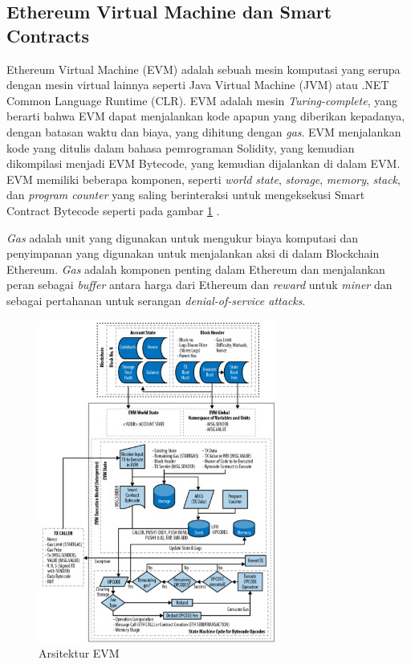\subsection{Ethereum Virtual Machine dan Smart Contracts}
\label{subsec:evm-smart-contract}

Ethereum Virtual Machine (EVM) adalah sebuah mesin komputasi yang serupa dengan mesin virtual lainnya seperti Java Virtual Machine (JVM) atau .NET Common Language Runtime (CLR). EVM adalah mesin \textit{Turing-complete}, yang berarti bahwa EVM dapat menjalankan kode apapun yang diberikan kepadanya, dengan batasan waktu dan biaya, yang dihitung dengan \textit{gas}. EVM menjalankan kode yang ditulis dalam bahasa pemrograman Solidity, yang kemudian dikompilasi menjadi EVM Bytecode, yang kemudian dijalankan di dalam EVM. EVM memiliki beberapa komponen, seperti \textit{world state}, \textit{storage}, \textit{memory}, \textit{stack}, dan \textit{program counter} yang saling berinteraksi untuk mengeksekusi Smart Contract Bytecode seperti pada gambar \ref{image:evm-architecture} \parencite{wood2014ethereum}. 

\textit{Gas} adalah unit yang digunakan untuk mengukur biaya komputasi dan penyimpanan yang digunakan untuk menjalankan aksi di dalam Blockchain Ethereum. \textit{Gas} adalah komponen penting dalam Ethereum dan menjalankan peran sebagai \textit{buffer} antara harga dari Ethereum dan \textit{reward} untuk \textit{miner} dan sebagai pertahanan untuk serangan \textit{denial-of-service attacks}. 

\begin{figure}[ht]
	\centering
	\includegraphics[width=0.7\textwidth]{resources/chapter-2/evm-architecture.png}
	\caption{Arsitektur EVM \parencite{antonopoulos2018mastering}}
	\label{image:evm-architecture}
\end{figure}

